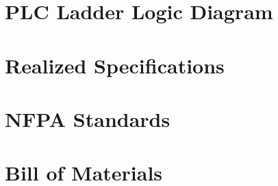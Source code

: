 \documentclass[hidelinks, 12pt]{article} %
\begin{document}
\newpage
\section{PLC Ladder Logic Diagram}
\label{sec:plc}

\pagebreak

\newpage
\section{Realized Specifications}
\label{sec:specs}

\pagebreak

\newpage
\section{NFPA Standards}
\label{sec:nfpa_standards}

\pagebreak

\newpage
\section{Bill of Materials}
\label{sec:bom}

\pagebreak

%
% 

% 
%

% 
\end{document}
